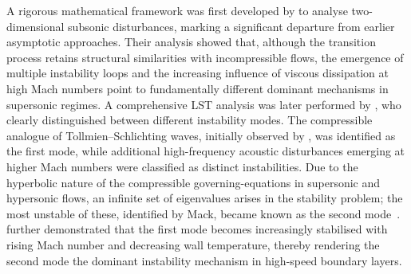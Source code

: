 A rigorous mathematical framework was first developed by \citet{LeesReshotko1962} to analyse two-dimensional subsonic disturbances, marking a significant departure from earlier asymptotic approaches. Their analysis showed that, although the transition process retains structural similarities with incompressible flows, the emergence of multiple instability loops and the increasing influence of viscous dissipation at high Mach numbers point to fundamentally different dominant mechanisms in supersonic regimes. A comprehensive \gls{LST} analysis was later performed by \citet{Mack1963,Mack1964}, who clearly distinguished between different instability modes. The compressible analogue of Tollmien--Schlichting waves, initially observed by \citet{LeesLin1946}, was identified as the first mode, while additional high-frequency acoustic disturbances emerging at higher Mach numbers were classified as distinct instabilities. Due to the hyperbolic nature of the compressible governing-equations in supersonic and hypersonic flows, an infinite set of eigenvalues arises in the stability problem; the most unstable of these, identified by Mack, became known as the second mode~\citep{Hudson1997}. \citet{Mack1975} further demonstrated that the first mode becomes increasingly stabilised with rising Mach number and decreasing wall temperature, thereby rendering the second mode the dominant instability mechanism in high-speed boundary layers.


